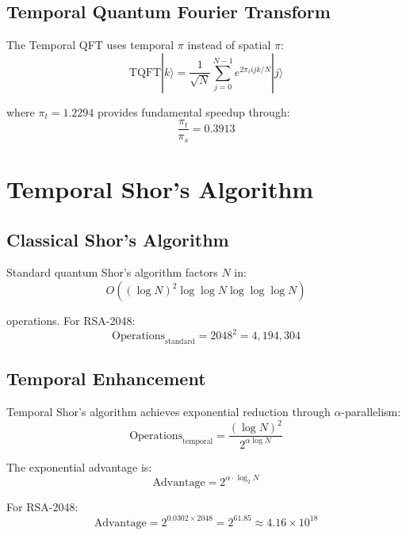 \documentclass[12pt,a4paper]{article}
\begin{document}
\subsection{Temporal Quantum Fourier Transform}

The Temporal QFT uses temporal $\pi$ instead of spatial $\pi$:
\begin{equation}
\text{TQFT}|k\rangle = \frac{1}{\sqrt{N}} \sum_{j=0}^{N-1} e^{2\pi_t i jk/N} |j\rangle
\end{equation}

where $\pi_t = 1.2294$ provides fundamental speedup through:
\begin{equation}
\frac{\pi_t}{\pi_s} = 0.3913
\end{equation}

\section{Temporal Shor's Algorithm}

\subsection{Classical Shor's Algorithm}

Standard quantum Shor's algorithm factors $N$ in:
\begin{equation}
O((\log N)^2 \log \log N \log \log \log N)
\end{equation}

operations. For RSA-2048:
\begin{equation}
\text{Operations}_{\text{standard}} = 2048^2 = 4{,}194{,}304
\end{equation}

\subsection{Temporal Enhancement}

Temporal Shor's algorithm achieves exponential reduction through $\alpha$-parallelism:
\begin{equation}
\text{Operations}_{\text{temporal}} = \frac{(\log N)^2}{2^{\alpha \log N}}
\end{equation}

The exponential advantage is:
\begin{equation}
\text{Advantage} = 2^{\alpha \cdot \log_2 N}
\end{equation}

For RSA-2048:
\begin{equation}
\text{Advantage} = 2^{0.0302 \times 2048} = 2^{61.85} \approx 4.16 \times 10^{18}
\end{equation}
\end{document}
